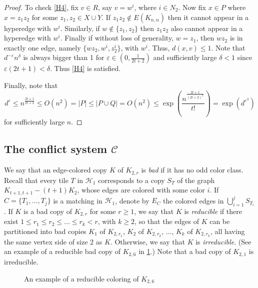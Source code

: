 \documentclass{article}
\theoremstyle{definition}
\newcommand\cH{{\mathcal H}}
\newcommand\cC{{\mathcal C}}
\begin{document}
\begin{proof}
 To check \ref{H4}, fix $v\in R$, say $v = w^i$, where $i\in N_2$. Now fix $x\in P$ where $x = z_1z_2$ for some $z_1,z_2\in X\cup Y$. If $z_1z_2\notin E(K_{n,n})$ then it cannot appear in a hyperedge with $w^i$. Similarly, if $w\notin \{z_1,z_2\}$ then $z_1z_2$ also cannot appear in a hyperedge with $w^i$. Finally if without loss of generality, $w = z_1$, then $wz_2$ is in exactly one edge, namely $\{wz_2, w^i,z_2^i\}$, with $w^i$. Thus, $d(x,v) \leq 1$. Note that $d^{-\varepsilon} n^\delta$ is always bigger than 1 for $\varepsilon \in (0, \frac{1}{2t+2})$ and sufficiently large $\delta < 1$ since $\varepsilon (2t+1) < \delta$. Thus \ref{H4} is satisfied.
 
   Finally, note that 
    $$
        d^\varepsilon 
        \leq n^{\frac{2t+1}{2t+2}} \leq O(n^2) 
        = |P|
        \leq |P \cup Q|
        = O(n^2)
        \leq \exp \left(\frac{n^{\frac{2t+1}{(2t+2)^3}}}{t!} \right)
        = \exp \left( d^{\varepsilon^3} \right)
    $$
    for sufficiently large $n$.
\end{proof}



\subsection{The conflict system $\cC$}\label{sec:conC}






 




We say that an edge-colored copy $K$ of $K_{2,r}$ is {\em bad} if it has no odd color class. 
Recall that every tile $T$ in $\cH_1$ corresponds to a copy $S_T$ of the graph $K_{t+1,t+1}-(t+1)K_2$, whose edges are colored with some color $i$. If   $C = \{ T_1, \dots, T_j\}$ is a matching in $\cH_1$, denote by $E_C$ the colored edges in $\bigcup_{i=1}^j S_{T_i}$. If $K$ is a bad copy of $K_{2,r}$ for some $r\ge 1$,  we say that $K$ is {\em reducible} if there exist $1 \leq r_1 \leq r_2 \leq \dots \leq r_k < r$, with $k\ge 2$, so that  the edges of $K$ can be partitioned into bad  copies $K_1$ of $K_{2,r_1}$, $K_2$ of $K_{2,r_2}$, $\dots$, $K_k$ of $K_{2,r_k}$, all having the same vertex side of size 2 as $K$. Otherwise, we say that $K$ is {\em irreducible}. (See an example of a reducible bad copy of $K_{2,6}$ in \cref{fig:reducible}.) 
Note that a bad copy of $K_{2,1}$ is irreducible.

\begin{figure}[h!]
    \centering
    
    \caption{An example of a reducible coloring of $K_{2,6}$}
    \label{fig:reducible}
\end{figure}
\end{document}
